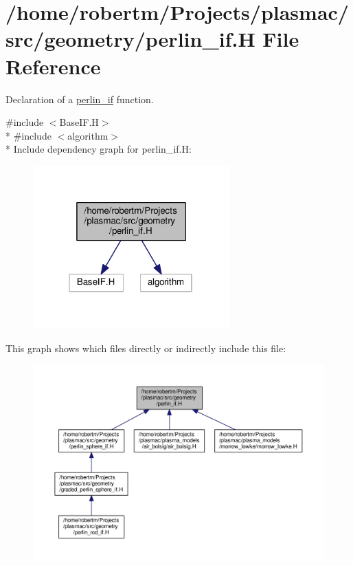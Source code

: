 \hypertarget{perlin__if_8H}{}\section{/home/robertm/\+Projects/plasmac/src/geometry/perlin\+\_\+if.H File Reference}
\label{perlin__if_8H}


Declaration of a \hyperlink{classperlin__if}{perlin\+\_\+if} function.  


{\ttfamily \#include $<$Base\+I\+F.\+H$>$}\\*
{\ttfamily \#include $<$algorithm$>$}\\*
Include dependency graph for perlin\+\_\+if.\+H\+:\nopagebreak
\begin{figure}[H]
\begin{center}
\leavevmode
\includegraphics[width=214pt]{perlin__if_8H__incl}
\end{center}
\end{figure}
This graph shows which files directly or indirectly include this file\+:\nopagebreak
\begin{figure}[H]
\begin{center}
\leavevmode
\includegraphics[width=350pt]{perlin__if_8H__dep__incl}
\end{center}
\end{figure}
